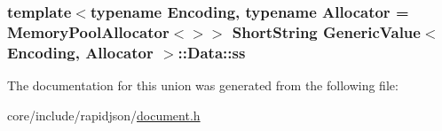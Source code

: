 \subsubsection[{\texorpdfstring{ss}{ss}}]{\setlength{\rightskip}{0pt plus 5cm}template$<$typename Encoding, typename Allocator = Memory\+Pool\+Allocator$<$$>$$>$ {\bf Short\+String} {\bf Generic\+Value}$<$ Encoding, Allocator $>$\+::Data\+::ss}\hypertarget{unionGenericValue_1_1Data_a410e39a5dc296eb3b152b54193740e4c}{}\label{unionGenericValue_1_1Data_a410e39a5dc296eb3b152b54193740e4c}


The documentation for this union was generated from the following file\+:\begin{DoxyCompactItemize}
\item 
core/include/rapidjson/\hyperlink{document_8h}{document.\+h}\end{DoxyCompactItemize}
